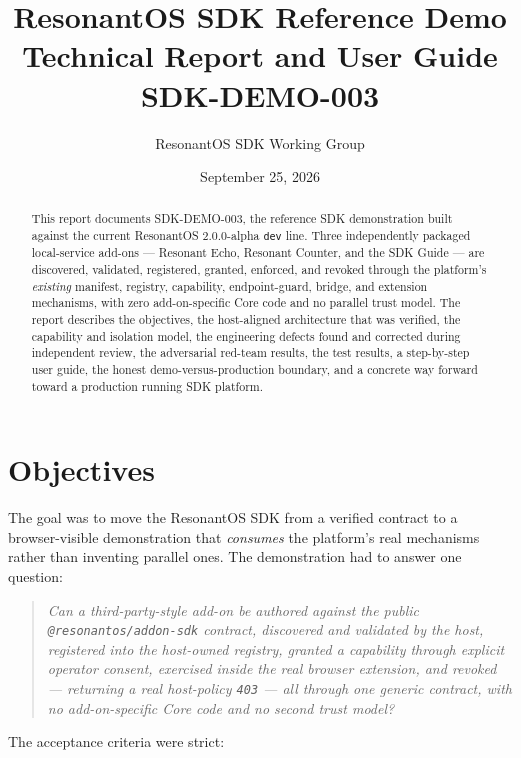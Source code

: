 \documentclass[11pt]{article}
\title{
  \vspace{-2em}
  \textbf{ResonantOS SDK Reference Demo}\\[0.4em]
  \large Technical Report and User Guide\\[0.2em]
  \normalsize \textsc{SDK-DEMO-003}
}
\author{ResonantOS SDK Working Group}
\date{September 25, 2026}
\begin{document}
\maketitle

\begin{abstract}
This report documents \textsc{SDK-DEMO-003}, the reference SDK demonstration
built against the current ResonantOS $2.0.0$-alpha \texttt{dev} line. Three
independently packaged local-service add-ons --- Resonant Echo, Resonant
Counter, and the SDK Guide --- are discovered, validated, registered,
granted, enforced, and revoked through the platform's \emph{existing}
manifest, registry, capability, endpoint-guard, bridge, and extension
mechanisms, with zero add-on-specific Core code and no parallel trust model.
The report describes the objectives, the host-aligned architecture that was
verified, the capability and isolation model, the engineering defects found
and corrected during independent review, the adversarial red-team results, the
test results, a step-by-step user guide, the honest demo-versus-production
boundary, and a concrete way forward toward a production running SDK platform.
\end{abstract}

\tableofcontents

\section{Objectives}

The goal was to move the ResonantOS SDK from a verified contract to a
browser-visible demonstration that \emph{consumes} the platform's real
mechanisms rather than inventing parallel ones. The demonstration had to
answer one question:

\begin{quote}
\itshape
Can a third-party-style add-on be authored against the public
\texttt{@resonantos/addon-sdk} contract, discovered and validated by the host,
registered into the host-owned registry, granted a capability through explicit
operator consent, exercised inside the real browser extension, and revoked ---
returning a real host-policy \texttt{403} --- all through one generic contract,
with no add-on-specific Core code and no second trust model?
\end{quote}

The acceptance criteria were strict:
\end{document}
